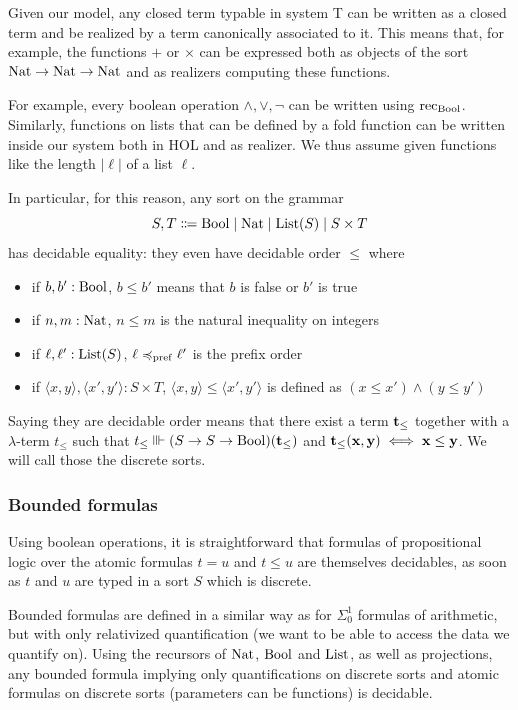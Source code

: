 \documentclass[a4paper,UKenglish,cleveref, autoref, thm-restate]{lipics-v2021}
\begin{document}
Given our model, any closed term typable in system T can be written as a closed term and be realized by a term canonically associated to it. This means that, for example, the functions $+$ or $\times$ can be expressed both as objects of the sort $\mathrm{Nat} \to \mathrm{Nat} \to \mathrm{Nat}$ and as realizers computing these functions.

For example, every boolean operation $\land,\lor,\lnot$ can be written using $\mathrm{rec}_{\mathrm{Bool}}$. Similarly, functions on lists that can be defined by a fold function can be written inside our system both in HOL and as realizer. We thus assume given functions like the length $|\ell|$ of a list $\ell$.

In particular, for this reason, any sort on the grammar
\[S,T\Coloneq \Bool\mid\Nat\mid\List(S)\mid S\times T\]
has decidable equality: they even have decidable order $\leq$ where
\begin{itemize}
\item if $b,b' : \mathrm{Bool}$, $b \leq b'$ means that $b$ is false or $b'$ is true
\item if $n,m : \mathrm{Nat}$, $n \leq m$ is the natural inequality on integers
\item if $\ell,\ell' : \mathrm{List}(S)$, $\ell \preccurlyeq_{\mathrm{pref}} \ell'$ is the prefix order
\item if $\langle x,y\rangle,\langle x',y'\rangle : S \times T$, $\langle x,y\rangle \leq \langle x',y'\rangle$ is defined as $(x \leq x') \land (y\leq y')$
\end{itemize}
Saying they are decidable order means that there exist a term $\mathbf{t}_{\leq}$ together with a $\lambda$-term $t_{\leq}$ such that
$t_{\leq} \Vvdash (S\to S \to \mathrm{Bool})(\mathbf{t}_{\leq})$ and $\mathbf{t}_{\leq}(\mathbf{x},\mathbf{y}) \iff \mathbf{x} \leq \mathbf{y}$.
We will call those the discrete sorts.

\subsubsection{Bounded formulas}

Using boolean operations, it is straightforward that formulas of propositional logic over the atomic formulas
$t = u $ and $t \leq u$
are themselves decidables, as soon as $t$ and $u$ are typed in a sort $S$ which is discrete.

Bounded formulas are defined in a similar way as for $\Sigma_0^1$ formulas of arithmetic, but with only relativized quantification (we want to be able to access the data we quantify on).  Using the recursors of $\mathrm{Nat}$, $\mathrm{Bool}$ and $\mathrm{List}$, as well as projections, any bounded formula implying only quantifications on discrete sorts and atomic formulas on discrete sorts (parameters can be functions) is decidable.
\end{document}
